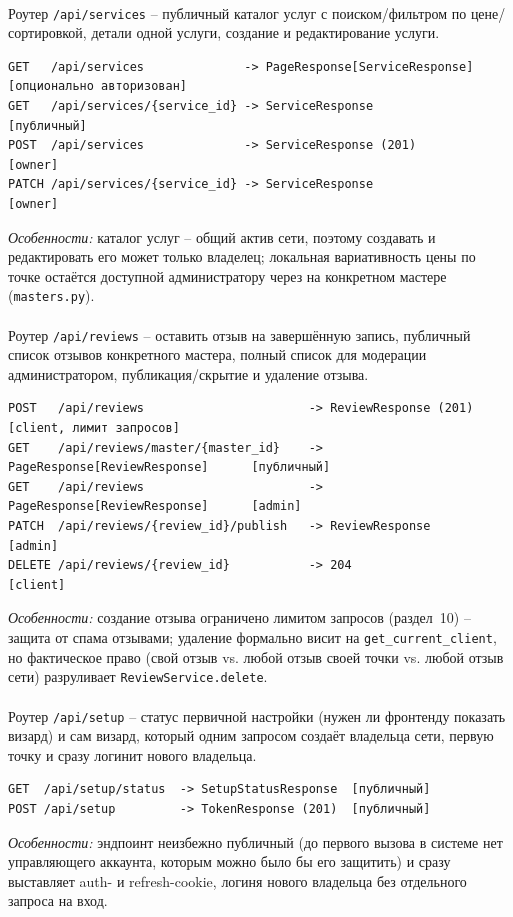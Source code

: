 \paragraph{}
Роутер \texttt{/api/services} -- публичный каталог услуг с
поиском/фильтром по цене/сортировкой, детали одной услуги, создание и
редактирование услуги.
\begin{verbatim}
GET   /api/services              -> PageResponse[ServiceResponse]  [опционально авторизован]
GET   /api/services/{service_id} -> ServiceResponse                [публичный]
POST  /api/services              -> ServiceResponse (201)          [owner]
PATCH /api/services/{service_id} -> ServiceResponse                [owner]
\end{verbatim}
\textit{Особенности:} каталог услуг -- общий актив сети, поэтому
создавать и редактировать его может только владелец; локальная вариативность
цены по точке остаётся доступной администратору через
 на конкретном мастере (\texttt{masters.py}).

\paragraph{}
Роутер \texttt{/api/reviews} -- оставить отзыв на завершённую запись,
публичный список отзывов конкретного мастера, полный список для
модерации администратором, публикация/скрытие и удаление отзыва.
\begin{verbatim}
POST   /api/reviews                       -> ReviewResponse (201)              [client, лимит запросов]
GET    /api/reviews/master/{master_id}    -> PageResponse[ReviewResponse]      [публичный]
GET    /api/reviews                       -> PageResponse[ReviewResponse]      [admin]
PATCH  /api/reviews/{review_id}/publish   -> ReviewResponse                    [admin]
DELETE /api/reviews/{review_id}           -> 204                               [client]
\end{verbatim}
\textit{Особенности:} создание отзыва ограничено лимитом запросов
(раздел~10) -- защита от спама отзывами; удаление формально висит на
\texttt{get_current_client}, но фактическое право (свой отзыв vs. любой
отзыв своей точки vs. любой отзыв сети) разруливает
\texttt{ReviewService.delete}.

\paragraph{}
Роутер \texttt{/api/setup} -- статус первичной настройки (нужен ли
фронтенду показать визард) и сам визард, который одним запросом создаёт
владельца сети, первую точку и сразу логинит нового владельца.
\begin{verbatim}
GET  /api/setup/status  -> SetupStatusResponse  [публичный]
POST /api/setup         -> TokenResponse (201)  [публичный]
\end{verbatim}
\textit{Особенности:} эндпоинт неизбежно публичный (до первого вызова в
системе нет управляющего аккаунта, которым можно было бы его защитить) и
сразу выставляет auth- и refresh-cookie, логиня нового владельца без
отдельного запроса на вход.

